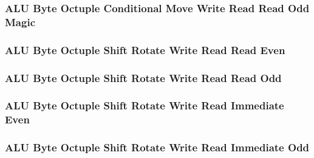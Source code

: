 

\subsubsection[{\small ALU Byte Octuple Conditional Move Write Read Read Odd Magic}]{ALU Byte Octuple Conditional Move Write Read Read Odd Magic} \label{sec:format-ALU-BOCMWRRO.M}



\subsubsection[{\small ALU Byte Octuple Shift Rotate Write Read Read Even}]{ALU Byte Octuple Shift Rotate Write Read Read Even} \label{sec:format-ALU-BOSWRRE}



\subsubsection[{\small ALU Byte Octuple Shift Rotate Write Read Read Odd}]{ALU Byte Octuple Shift Rotate Write Read Read Odd} \label{sec:format-ALU-BOSWRRO}



\subsubsection[{\small ALU Byte Octuple Shift Rotate Write Read Immediate Even}]{ALU Byte Octuple Shift Rotate Write Read Immediate Even} \label{sec:format-ALU-BOSWRIE}



\subsubsection[{\small ALU Byte Octuple Shift Rotate Write Read Immediate Odd}]{ALU Byte Octuple Shift Rotate Write Read Immediate Odd} \label{sec:format-ALU-BOSWRIO}

